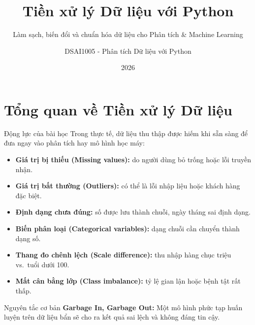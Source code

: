 \documentclass[aspectratio=169,11pt]{beamer}
\title[Tiền xử lý Dữ liệu với Python]{Tiền xử lý Dữ liệu với Python}
\subtitle{Làm sạch, biến đổi và chuẩn hóa dữ liệu cho Phân tích \& Machine Learning}
\author{DSAI1005 - Phân tích Dữ liệu với Python}
\institute{Khoa Khoa học Dữ liệu và Trí tuệ Nhân tạo\\Đại học Kinh tế Quốc dân}
\date{2026}
\newcommand{\smallgap}{\vspace{0.35em}}
\begin{document}
\begin{frame}
  \titlepage
\end{frame}

\section{Tổng quan về Tiền xử lý Dữ liệu}

\begin{frame}{Động lực của bài học}
Trong thực tế, dữ liệu thu thập được hiếm khi sẵn sàng để đưa ngay vào phân tích hay mô hình học máy:
\begin{itemize}
  \item \textbf{Giá trị bị thiếu (Missing values):} do người dùng bỏ trống hoặc lỗi truyền nhận.
  \item \textbf{Giá trị bất thường (Outliers):} có thể là lỗi nhập liệu hoặc khách hàng đặc biệt.
  \item \textbf{Định dạng chưa đúng:} số được lưu thành chuỗi, ngày tháng sai định dạng.
  \item \textbf{Biến phân loại (Categorical variables):} dạng chuỗi cần chuyển thành dạng số.
  \item \textbf{Thang đo chênh lệch (Scale difference):} thu nhập hàng chục triệu vs.\ tuổi dưới 100.
  \item \textbf{Mất cân bằng lớp (Class imbalance):} tỷ lệ gian lận hoặc bệnh tật rất thấp.
\end{itemize}

\smallgap
\begin{alertblock}{Nguyên tắc cơ bản}
\textbf{Garbage In, Garbage Out:} Một mô hình phức tạp huấn luyện trên dữ liệu bẩn sẽ cho ra kết quả sai lệch và không đáng tin cậy.
\end{alertblock}
\end{frame}
\end{document}
